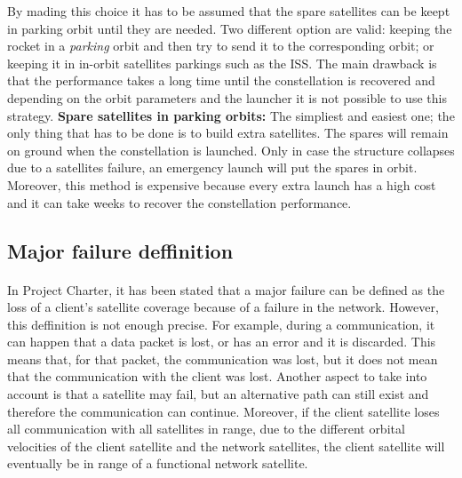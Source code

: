 By mading this choice it has to be assumed that the spare satellites can be keept in parking orbit until they are needed. Two different option are valid: keeping the rocket in a \textit{parking} orbit and then try to send it to the corresponding orbit; or keeping it in in-orbit satellites parkings such as the ISS. The main drawback is that the performance takes a long time until the constellation is recovered and depending on the orbit parameters and the launcher it is not possible to use this strategy.  
\newline
\newline
\textbf{Spare satellites in parking orbits:}
\newline
The simpliest and easiest one; the only thing that has to be done is to build extra satellites. The spares will remain on ground when the constellation is launched. Only in case the structure collapses due to a satellites failure, an emergency launch will put the spares in orbit. Moreover, this method is expensive because every extra launch has a high cost and it can take weeks to recover the constellation performance. 
\newline

\subsection{Major failure deffinition}

\paragraph{}In Project Charter, it has been stated that a major failure can be defined as the loss of a client’s satellite coverage because of a failure in the network. However, this deffinition is not enough precise. For example, during a communication, it can happen that a data packet is lost, or has an error and it is discarded. This means that, for that packet, the communication was lost, but it does not mean that the communication with the client was lost. Another aspect to take into account is that a satellite may fail, but an alternative path can still exist and therefore the communication can continue. Moreover, if the client satellite loses all communication with all satellites in range, due to the different orbital velocities of the client satellite and the network satellites, the client satellite will eventually be in range of a functional network satellite.


